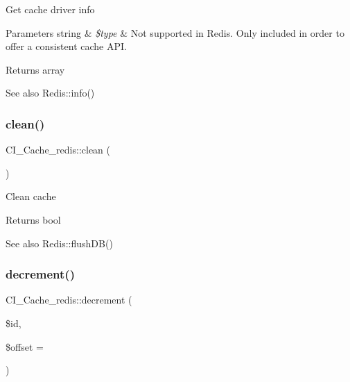 Get cache driver info


\begin{DoxyParams}[1]{Parameters}
string & {\em \$type} & Not supported in Redis. Only included in order to offer a consistent cache A\+PI. \\
\hline
\end{DoxyParams}
\begin{DoxyReturn}{Returns}
array 
\end{DoxyReturn}
\begin{DoxySeeAlso}{See also}
Redis\+::info() 
\end{DoxySeeAlso}
\mbox{\label{class_c_i___cache__redis_a19c82fbc3b7146eca92cbe27e42f8227}} 
\subsubsection{\texorpdfstring{clean()}{clean()}}
{\footnotesize\ttfamily C\+I\+\_\+\+Cache\+\_\+redis\+::clean (\begin{DoxyParamCaption}{ }\end{DoxyParamCaption})}

Clean cache

\begin{DoxyReturn}{Returns}
bool 
\end{DoxyReturn}
\begin{DoxySeeAlso}{See also}
Redis\+::flush\+D\+B() 
\end{DoxySeeAlso}
\mbox{\label{class_c_i___cache__redis_a99c79630faef219ec87e52d821a8d149}} 
\subsubsection{\texorpdfstring{decrement()}{decrement()}}
{\footnotesize\ttfamily C\+I\+\_\+\+Cache\+\_\+redis\+::decrement (\begin{DoxyParamCaption}\item[{}]{\$id,  }\item[{}]{\$offset = {} }\end{DoxyParamCaption})}


